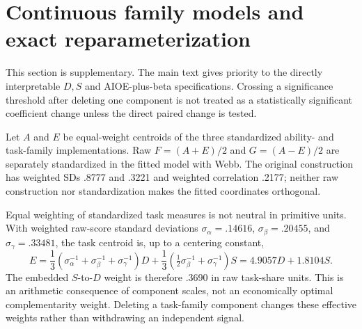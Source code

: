 \section{Continuous family models and exact reparameterization}\label{app:fgae}

This section is supplementary. The main text gives priority to the directly interpretable $D,S$ and AIOE-plus-beta specifications. Crossing a significance threshold after deleting one component is not treated as a statistically significant coefficient change unless the direct paired change is tested.

Let $A$ and $E$ be equal-weight centroids of the three standardized ability- and task-family implementations. Raw $F=(A+E)/2$ and $G=(A-E)/2$ are separately standardized in the fitted model with Webb. The original construction has weighted SDs .8777 and .3221 and weighted correlation .2177; neither raw construction nor standardization makes the fitted coordinates orthogonal.

Equal weighting of standardized task measures is not neutral in primitive units. With weighted raw-score standard deviations $\sigma_\alpha=.14616$, $\sigma_\beta=.20455$, and $\sigma_\gamma=.33481$, the task centroid is, up to a centering constant,
\[
E=\frac13\left(\sigma_\alpha^{-1}+\sigma_\beta^{-1}+\sigma_\gamma^{-1}\right)D
+\frac13\left(\tfrac12\sigma_\beta^{-1}+\sigma_\gamma^{-1}\right)S
=4.9057D+1.8104S.
\]
The embedded $S$-to-$D$ weight is therefore .3690 in raw task-share units. This is an arithmetic consequence of component scales, not an economically optimal complementarity weight. Deleting a task-family component changes these effective weights rather than withdrawing an independent signal.

